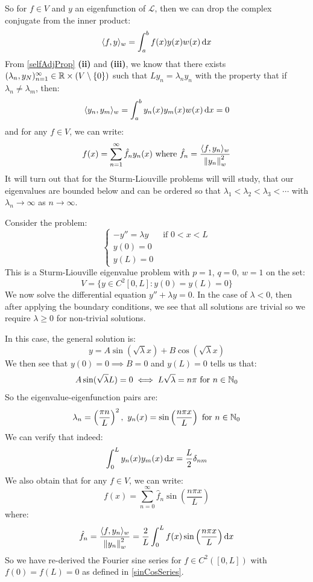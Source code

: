\documentclass[../main.tex]{subfiles}
\begin{document}
So for $f \in V$ and $y$ an eigenfunction of $\mathcal{L}$, then we can drop the complex conjugate from the inner product:
\[
  \langle f, y \rangle_{w} = \int_{a}^{b} f(x) y(x) w(x) \d{x}
\]
From \cref{selfAdjProp} \textbf{(ii)} and \textbf{(iii)}, we know that there exists $(\lambda_n, y_N)_{n = 1}^\infty \in \mathbb{R} \times (V \setminus \{0\})$ such that $L y_n = \lambda_n y_n$ with the property that if $\lambda_n \neq \lambda_m$, then:
\[
  \langle y_n, y_m \rangle_{w} = \int_{a}^{b} y_n(x) y_m(x) w(x) \d{x} = 0
\]
and for any $f \in V$, we can write:
\begin{equation}
  f(x) = \sum_{n = 1}^{\infty} \hat{f}_n y_n(x) \text{ where } \hat{f}_n = \frac{\langle f, y_n \rangle_{w}}{\left\lVert y_n \right\rVert^2_{w}} \label{generalisedFourier}
\end{equation}
It will turn out that for the Sturm-Liouville problems will will study, that our eigenvalues are bounded below and can be ordered so that $\lambda_1 < \lambda_2 < \lambda_3 < \cdots$ with $\lambda_n \to \infty$ as $n \to \infty$.
\begin{example} \label{slpExample}
  Consider the problem:
  \[
    \begin{cases}
    -y'' = \lambda y & \text{ if } 0 < x < L \\
    y(0) = 0 &  \\
    y(L) = 0 &
    \end{cases}
  \]
  This is a Sturm-Liouville eigenvalue problem with $p = 1$, $q = 0$, $w = 1$ on the set:
  \[
    V = \{y \in C^2[0, L]: y(0) = y(L) = 0\}
  \]
  We now solve the differential equation $y'' + \lambda y = 0$.
  In the case of $\lambda < 0$, then after applying the boundary conditions, we see that all solutions are trivial so we require $\lambda \geq 0$ for non-trivial solutions.

  In this case, the general solution is:
  \[
    y = A \sin(\sqrt{\lambda} x) + B \cos(\sqrt{\lambda} x)
  \]
  We then see that $y(0) = 0 \implies B = 0$ and $y(L) = 0$ tells us that:
  \[
    A \sin (\sqrt{\lambda} L) = 0 \iff L\sqrt{\lambda} = n \pi \text{ for } n \in \mathbb{N}_0
  \]
  So the eigenvalue-eigenfunction pairs are:
  \[
    \lambda_n = \left(\frac{\pi n}{L}\right)^2,\ y_n(x) = \sin\left(\frac{n\pi x}{L}\right) \text{ for } n \in \N_0
  \]
  We can verify that indeed:
  \[
    \int_{0}^{L} y_n(x) y_m(x) \d{x} = \frac{L}{2} \delta_{n m}
  \]
  We also obtain that for any $f \in V$, we can write:
  \[
    f(x) = \sum_{n=0}^{\infty} \hat{f}_n \sin\left(\frac{n \pi x}{L}\right)
  \]
  where:
  \[
    \hat{f}_n = \frac{\langle f, y_n \rangle_{w}}{\norm{y_n}_{w}^2} = \frac{2}{L} \int_{0}^{L} f(x) \sin\left(\frac{n \pi x}{L}\right) \d{x}
  \]
  So we have re-derived the Fourier sine series for $f \in C^2([0, L])$ with $f(0) = f(L) = 0$ as defined in \cref{sinCosSeries}.
\end{example}
\end{document}
